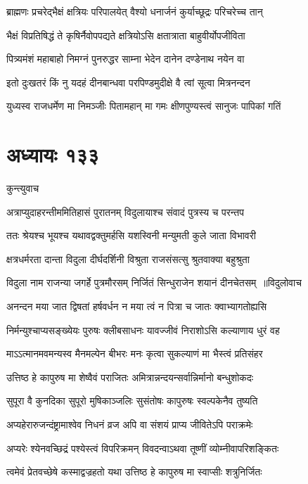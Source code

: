 \twolineshloka
{ब्राह्मणः प्रचरेद्भैक्षं क्षत्रियः परिपालयेत्}
{वैश्यो धनार्जनं कुर्याच्छूद्रः परिचरेच्च तान्}


\twolineshloka
{भैक्षं विप्रतिषिद्धं ते कृषिर्नैवोपपद्यते}
{क्षत्रियोऽसि क्षतात्राता बाहुवीर्योपजीविता}


\twolineshloka
{पित्र्यमंशं महाबाहो निमग्नं पुनरुद्धर}
{साम्ना भेदेन दानेन दण्डेनाथ नयेन वा}


\twolineshloka
{इतो दुःखतरं किं नु यदहं दीनबान्धवा}
{परपिण्डमुदीक्षे वै त्वां सूत्वा मित्रनन्दन}


\twolineshloka
{युध्यस्व राजधर्मेण मा निमञ्जीः पितामहान्}
{मा गमः क्षीणपुण्यस्त्वं सानुजः पापिकां गतिं}


\chapter{अध्यायः १३३}
\twolineshloka
{कुन्त्युवाच}
{}


\twolineshloka
{अत्राप्युदाहरन्तीममितिहासं पुरातनम्}
{विदुलायाश्च संवादं पुत्रस्य च परन्तप}


\twolineshloka
{ततः श्रेयश्च भूयश्च यथावद्वक्तुमर्हसि}
{यशस्विनी मन्युमती कुले जाता विभावरी}


\twolineshloka
{क्षत्रधर्मरता दान्ता विदुला दीर्घदर्शिनी}
{विश्रुता राजसंसत्सु श्रुतवाक्या बहुश्रुता}


\threelineshloka
{विदुला नाम राजन्या जगर्हे पुत्रमौरसम्}
{निर्जितं सिन्धुराजेन शयानं दीनचेतसम् ॥विदुलोवाच}
{}


\twolineshloka
{अनन्दन मया जात द्विषतां हर्षवर्धन}
{न मया त्वं न पित्रा च जातः क्वाभ्यागतोह्यसि}


\twolineshloka
{निर्मन्युश्चाप्यसङ्ख्येयः पुरुषः क्लीबसाधनः}
{यावज्जीवं निराशोऽसि कल्याणाय धुरं वह}


\twolineshloka
{माऽऽत्मानमवमन्यस्व मैनमल्पेन बीभरः}
{मनः कृत्वा सुकल्याणं मा भैस्त्वं प्रतिसंहर}


\twolineshloka
{उत्तिष्ठ हे कापुरुष मा शेष्वैवं पराजितः}
{अमित्रान्नन्दयन्सर्वान्निर्मानो बन्धुशोकदः}


\twolineshloka
{सुपूरा वै कुनदिका सुपूरो मुषिकाञ्जलिः}
{सुसंतोषः कापुरुषः स्वल्पकेनैव तुष्यति}


\twolineshloka
{अप्यहेरारुजन्दंष्ट्रामाश्वेव निधनं व्रज}
{अपि वा संशयं प्राप्य जीवितेऽपि पराक्रमेः}


\twolineshloka
{अप्यरेः श्येनवच्छिद्रं पश्येस्त्वं विपरिक्रमन्}
{विवदन्वाऽथवा तूष्णीं व्योम्नीवापरिशङ्कितः}


\twolineshloka
{त्वमेवं प्रेतवच्छेषे कस्माद्वज्रहतो यथा}
{उत्तिष्ठ हे कापुरुष मा स्वाप्सीः शत्रुनिर्जितः}



